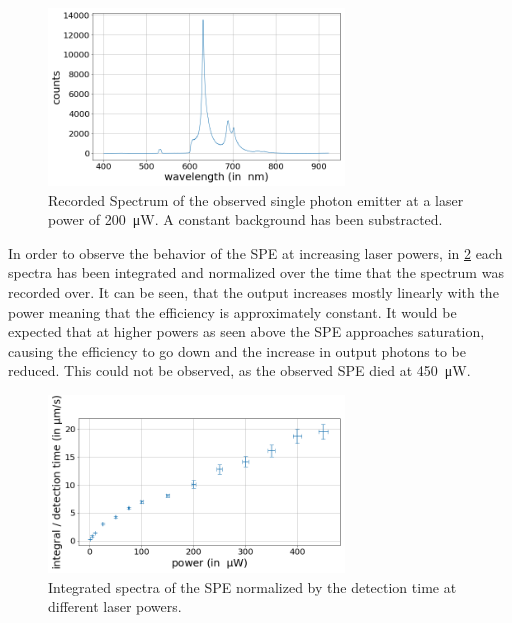 \begin{figure}[H]
    \centering
    \includegraphics[width=0.7\textwidth]{img/output_t2/spektrum_example_bgcorr_200.0muW.png}
    \caption{Recorded Spectrum of the observed single photon emitter at a laser power of \SI{200}{\micro W}. A constant background has been substracted.}
    \label{fig_spe_spectrum_example}
\end{figure}

In order to observe the behavior of the SPE at increasing laser powers, in \cref{fig_spe_integrals} each spectra has been integrated and normalized over the time that the spectrum was recorded over. %
It can be seen, that the output increases mostly linearly with the power meaning that the efficiency is approximately constant.
It would be expected that at higher powers as seen above the SPE approaches saturation, causing the efficiency to go down and the increase in output photons to be reduced.
This could not be observed, as the observed SPE died at \SI{450}{\micro W}.

\begin{figure}[H]
    \centering
    \includegraphics[width=0.7\textwidth]{img/output_t2/integrals.png}
    \caption{Integrated spectra of the SPE normalized by the detection time at different laser powers.}
    \label{fig_spe_integrals}
\end{figure}
